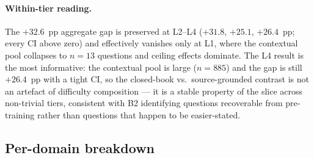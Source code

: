 \paragraph{Within-tier reading.} The $+32.6$~pp aggregate gap is
preserved at L2--L4 ($+31.8$, $+25.1$, $+26.4$~pp; every CI above
zero) and effectively vanishes only at L1, where the contextual pool
collapses to $n{=}13$ questions and ceiling effects dominate. The L4
result is the most informative: the contextual pool is large
($n{=}885$) and the gap is still $+26.4$~pp with a tight CI, so the
closed-book vs.\ source-grounded contrast is not an artefact of
difficulty composition --- it is a stable property of the slice
across non-trivial tiers, consistent with B2 identifying questions
recoverable from pre-training rather than questions that happen to be
easier-stated.

\FloatBarrier
\subsection{Per-domain breakdown}

